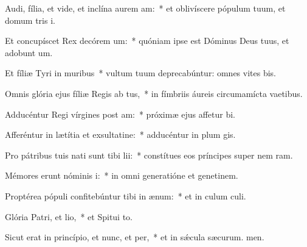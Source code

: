 \item Audi, fília, et vide, et inclína aurem am:~* et oblivíscere pópulum tuum, et domum tris i.
\item Et concupíscet Rex decórem um:~* quóniam ipse est Dóminus Deus tuus, et adobunt um.
\item Et fíliæ Tyri in muribus~* vultum tuum deprecabúntur: omnes vites bis.
\item Omnis glória ejus fíliæ Regis ab tus,~* in fímbriis áureis circumamícta vaetibus.
\item Adducéntur Regi vírgines post am:~* próximæ ejus affetur bi.
\item Afferéntur in lætítia et exsultatine:~* adducéntur in plum gis.
\item Pro pátribus tuis nati sunt tibi lii:~* constítues eos príncipes super nem ram.
\item Mémores erunt nóminis i:~* in omni generatióne et genetinem.
\item Proptérea pópuli confitebúntur tibi in ænum:~* et in culum culi.
\item Glória Patri, et lio,~* et Spitui to.
\item Sicut erat in princípio, et nunc, et per,~* et in sǽcula sæcurum. men.
